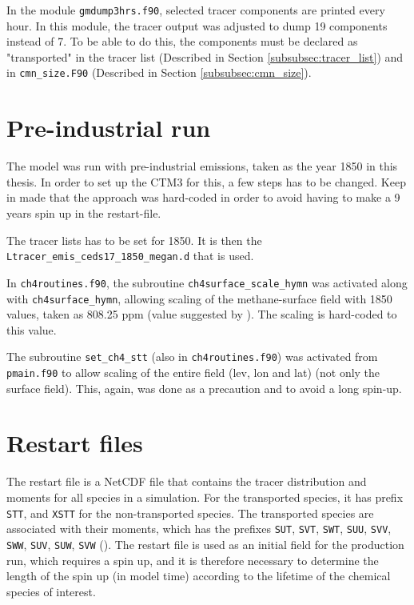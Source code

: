 In the module \texttt{gmdump3hrs.f90}, selected tracer components are printed every hour. In this module, the tracer output was adjusted to dump 19 components instead of 7. To be able to do this, the components must be declared as "transported" in the tracer list (Described in Section \ref{subsubsec:tracer_list}) and in \texttt{cmn\_size.F90} (Described in Section \ref{subsubsec:cmn_size}).

\section{Pre-industrial run}\label{sec:PI_setup}

The model was run with pre-industrial emissions, taken as the year 1850 in this thesis. In order to set up the CTM3 for this, a few steps has to be changed. Keep in made that the approach was hard-coded in order to avoid having to make a 9 years spin up in the restart-file. 

\medskip

The tracer lists has to be set for 1850. It is then the \texttt{Ltracer\_emis\_ceds17\_1850\_megan.d} that is used. 

\medskip

In \texttt{ch4routines.f90}, the subroutine \texttt{ch4surface\_scale\_hymn} was activated along with \texttt{ch4surface\_hymn}, allowing scaling of the methane-surface field with 1850 values, taken as 808.25 ppm (value suggested by \cite{RagnhildPersonal}). The scaling is hard-coded to this value. 

\medskip

The subroutine \texttt{set\_ch4\_stt} (also in \texttt{ch4routines.f90}) was activated from \texttt{pmain.f90} to allow scaling of the entire field (lev, lon and lat) (not only the surface field). This, again, was done as a precaution and to avoid a long spin-up. 

\section{Restart files}\label{subsec:restart_files}


The restart file is a NetCDF file that contains the tracer distribution and moments for all species in a simulation. For the transported species, it has prefix \texttt{STT}, and \texttt{XSTT} for the non-transported species. The transported species are associated with their moments, which has the prefixes \texttt{SUT}, \texttt{SVT}, \texttt{SWT}, \texttt{SUU}, \texttt{SVV}, \texttt{SWW}, \texttt{SUV}, \texttt{SUW}, \texttt{SVW} (\cite{SovdeManual}). The restart file is used as an initial field for the production run, which requires a spin up, and it is therefore necessary to determine the length of the spin up (in model time) according to the lifetime of the chemical species of interest. 

